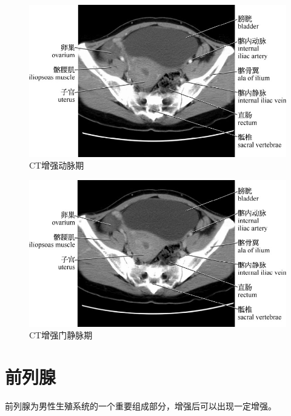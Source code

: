 \begin{figure}[!htbp]
 \centering
 \includegraphics{./images/Image00159.jpg}
 \captionsetup{justification=centering}
 \caption{CT增强动脉期}
  \end{figure} 
 \FloatBarrier

\begin{figure}[!htbp]
 \centering
 \includegraphics{./images/Image00160.jpg}
 \captionsetup{justification=centering}
 \caption{CT增强门静脉期}
  \end{figure} 
 \FloatBarrier

\section{前列腺}

前列腺为男性生殖系统的一个重要组成部分，增强后可以出现一定增强。

